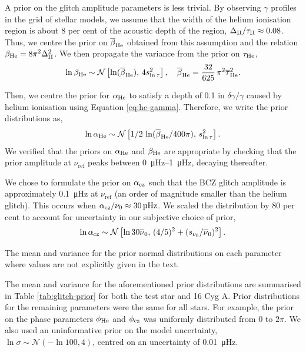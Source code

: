 A prior on the glitch amplitude parameters is less trivial. By observing \(\gamma\) profiles in the grid of stellar models, we assume that the width of the helium ionisation region is about 8 per cent of the acoustic depth of the region, \(\Delta_{{\mathrm{II}}}/\tau_{{\mathrm{II}}} \approx 0.08\). Thus, we centre the prior on \(\overline{\beta}_{{\mathrm{He}}}\) obtained from this assumption and the relation \(\beta_{{\mathrm{He}}} = 8\pi^2\Delta_{{\mathrm{II}}}^2\). We then propagate the variance from the prior on \(\tau_{{\mathrm{He}}}\),
%
\begin{equation*}
    \ln\beta_{{\mathrm{He}}} \sim \mathcal{N}\left[ \ln(\overline{\beta}_{{\mathrm{He}}}), \, 4 s_{\ln\tau}^2 \right], \quad \overline{\beta}_{{\mathrm{He}}} = \frac{32}{625} \, \pi^2 \overline{\tau}_{{\mathrm{He}}}^2.
\end{equation*}
%

Then, we centre the prior for \(\alpha_{{\mathrm{He}}}\) to satisfy a depth of 0.1 in \(\delta\gamma/\gamma\) caused by helium ionisation using Equation \ref{eq:he-gamma}. Therefore, we write the prior distributions as,
%
\begin{gather*}
    \ln\alpha_{{\mathrm{He}}} \sim \mathcal{N}\left[ 1/2 \, \ln({\overline{\beta}_{{\mathrm{He}}}}/{400\pi}), \, s_{\ln\tau}^2 \right].
\end{gather*}
%
We verified that the priors on \(\alpha_{{\mathrm{He}}}\) and \(\beta_{{\mathrm{He}}}\) are appropriate by checking that the prior amplitude at \(\nu_\mathrm{ref}\) peaks between \SIrange{0}{1}{\micro\hertz}, decaying thereafter.

We chose to formulate the prior on \(\alpha_{{\mathrm{cz}}}\) such that the BCZ glitch amplitude is approximately \SI{0.1}{\micro\hertz} at \(\nu_\mathrm{ref}\) (an order of magnitude smaller than the helium glitch). This occurs when \(\alpha_{{\mathrm{cz}}}/\nu_0 \approx \SI{30}{\micro\hertz}\). We scaled the distribution by 80 per cent to account for uncertainty in our subjective choice of prior,
%
\begin{equation*}
    \ln\alpha_{{\mathrm{cz}}} \sim \mathcal{N}\left[ \ln 30\overline{\nu}_0, \, (4/5)^2 + (s_{\nu_0}/\overline{\nu}_0)^2\right].
\end{equation*}
%

\begin{table}
    \centering
    \caption{The mean and variance for the prior normal distributions on each parameter where values are not explicitly given in the text.}
    \label{tab:glitch-prior}
    
\end{table}

The mean and variance for the aforementioned prior distributions are summarised in Table \ref{tab:glitch-prior} for both the test star and 16 Cyg A. Prior distributions for the remaining parameters were the same for all stars. For example, the prior on the phase parameters \(\phi_{{\mathrm{He}}}\) and \(\phi_{{\mathrm{cz}}}\) was uniformly distributed from 0 to \(2\pi\). We also used an uninformative prior on the model uncertainty, \(\ln\sigma \sim \mathcal{N}( - \ln 100, 4)\), centred on an uncertainty of \SI{0.01}{\micro\hertz}.

